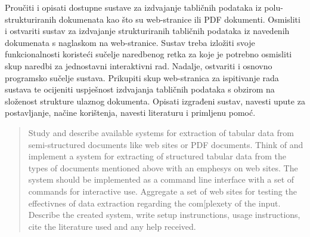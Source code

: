 \documentclass[times, utf8, zavrsni]{fer}
\begin{document}
\begin{sazetak}

Proučiti i opisati dostupne sustave za izdvajanje tabličnih podataka iz
polu-strukturiranih dokumenata kao što su web-stranice ili PDF dokumenti.
Osmisliti i ostvariti sustav za izdvajanje strukturiranih tabličnih podataka iz
navedenih dokumenata s naglaskom na web-stranice.
Sustav treba izložiti svoje funkcionalnosti koristeći sučelje naredbenog retka
za koje je potrebno osmisliti skup naredbi za jednostavni interaktivni rad.
Nadalje, ostvariti i osnovno programsko sučelje sustava. Prikupiti skup
web-stranica za ispitivanje rada sustava te ocijeniti uspješnost izdvajanja
tabličnih podataka s obzirom na složenost strukture ulaznog dokumenta. Opisati
izgrađeni sustav, navesti upute za postavljanje, načine korištenja, navesti
literaturu i primljenu pomoć.

\kljucnerijeci{}
\end{sazetak}

\begin{abstract}

Study and describe available systems for extraction of tabular data from
semi-structured documents like web sites or PDF documents. Think of and
implement a system for extracting of structured tabular data from the types of
documents mentioned above with an emphesys on web sites.
The system should be implemented as a command line interface with a set of
commands for interactive use. Aggregate a set of web sites for testing the
effectivnes of data extraction regarding the com[plexety of the input.
Describe the created system, write setup instrunctions, usage instructions,
cite the literature used and any help received.

\keywords{}
\end{abstract}
\end{document}
